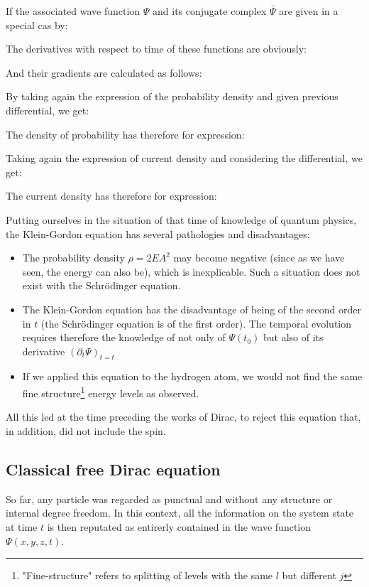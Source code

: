 	If the associated wave function $\Psi$ and its conjugate complex $\bar{\Psi}$ are given in a special cas by:
	
	The derivatives with respect to time of these functions are obviously:
	
	And their gradients are calculated as follows:
	
	By taking again the expression of the probability density and given previous differential, we get:
	
	The density of probability has therefore for expression:
	
	Taking again the expression of current density and considering the differential, we get:
	
	The current density has therefore for expression:
	
	Putting ourselves in the situation of that time of knowledge of quantum physics, the Klein-Gordon equation has several pathologies and disadvantages:
	\begin{itemize}
		\item The probability density $\rho=2EA^2$ may become negative (since as we have seen, the energy can also be), which is inexplicable. Such a situation does not exist with the Schrödinger equation.
		
		\item The Klein-Gordon equation has the disadvantage of being of the second order in $t$ (the Schrödinger equation is of the first order). The temporal evolution requires therefore the knowledge of not only of $\Psi(t_0)$ but also of its derivative $(\partial_t \Psi)_{t=t}$

		\item If we applied this equation to the hydrogen atom, we would not find the same fine structure\footnote{"Fine-structure" refers to splitting of levels with the same $l$ but different $j$} energy levels as observed.		
	\end{itemize}
	All this led at the time preceding the works of Dirac, to reject this equation that, in addition, did not include the spin.

	\pagebreak	
	\subsection{Classical free Dirac equation}
	So far, any particle was regarded as punctual and without any structure or internal degree freedom. In this context, all the information on the system state at time $t$ is then reputated as entirerly contained in the wave function $\Psi(x,y,z,t)$.

